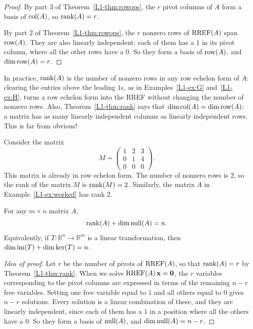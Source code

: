 \begin{proof}
    By part 3 of Theorem~\ref{L1-thm:rowops}, the $r$ pivot columns of $A$ form a basis of $\operatorname{col}(A)$, so $\operatorname{rank}(A) = r$.

    By part 2 of Theorem~\ref{L1-thm:rowops}, the $r$ nonzero rows of $\operatorname{RREF}(A)$ span $\operatorname{row}(A)$. They are also linearly independent: each of them has a $1$ in its pivot column, where all the other rows have a $0$. So they form a basis of $\operatorname{row}(A)$, and $\dim \operatorname{row}(A) = r$.
\end{proof}

\begin{remark}
    In practice, $\operatorname{rank}(A)$ is the number of nonzero rows in any row echelon form of $A$: clearing the entries above the leading $1$s, as in Examples~\ref{L1-ex:G} and~\ref{L1-ex:H}, turns a row echelon form into the RREF without changing the number of nonzero rows. Also, Theorem~\ref{L1-thm:rank} says that $\dim \operatorname{col}(A) = \dim \operatorname{row}(A)$: a matrix has as many linearly independent columns as linearly independent rows. This is far from obvious!
\end{remark}

\begin{example}
    Consider the matrix
    \[M = \begin{pmatrix}
        1 & 2 & 3 \\
        0 & 1 & 4 \\
        0 & 0 & 0
    \end{pmatrix}.\]
    This matrix is already in row echelon form. The number of nonzero rows is $2$, so the rank of the matrix $M$ is $\operatorname{rank}(M) = 2$. Similarly, the matrix $A$ in Example~\ref{L1-ex:worked} has rank $2$.
\end{example}

\begin{theorem}
    For any $m \times n$ matrix $A$,
    \[\operatorname{rank}(A) + \dim \operatorname{null}(A) = n.\]
    Equivalently, if $T: \mathbb{R}^n \to \mathbb{R}^m$ is a linear transformation, then $\dim \operatorname{im}(T) + \dim \ker(T) = n$.
\end{theorem}

\begin{proof}[Idea of proof]
    Let $r$ be the number of pivots of $\operatorname{RREF}(A)$, so that $\operatorname{rank}(A) = r$ by Theorem~\ref{L1-thm:rank}. When we solve $\operatorname{RREF}(A)\,\mathbf{x} = \mathbf{0}$, the $r$ variables corresponding to the pivot columns are expressed in terms of the remaining $n - r$ free variables. Setting one free variable equal to $1$ and all others equal to $0$ gives $n - r$ solutions. Every solution is a linear combination of these, and they are linearly independent, since each of them has a $1$ in a position where all the others have a $0$. So they form a basis of $\operatorname{null}(A)$, and $\dim \operatorname{null}(A) = n - r$.
\end{proof}

